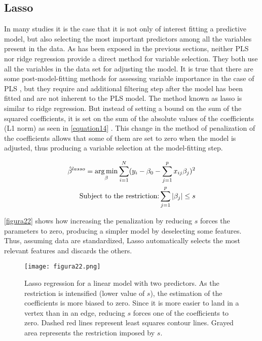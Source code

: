 \subsection{Lasso}
\label{lasso}
In many studies it is the case that it is not only of interest fitting a predictive model, but also selecting the most important predictors among all the variables present in the data. As has been exposed in the previous sections, neither PLS nor ridge regression provide a direct method for variable selection. They both use all the variables in the data set for adjusting the model. It is true that there are some post-model-fitting methods for assessing variable importance in the case of PLS \parencite{mehmood2012review}, but they require and additional filtering step after the model has been fitted and are not inherent to the PLS model. The method known as lasso is similar to ridge regression. But instead of setting a bound on the sum of the squared coefficients, it is set on the sum of the absolute values of the coefficients (L1 norm) as seen in \autoref{equation14} \parencite{tibshirani1996regression}. This change in the method of penalization of the coefficients allows that some of them are set to zero when the model is adjusted, thus producing a variable selection at the model-fitting step.

\begin{equation}
\label{equation14}
\begin{split}
\hat{\beta}^{lasso}=\operatorname*{arg\,min}_\beta \sum\limits_{i=1}^N (y_{i}-\beta_{0}-\sum\limits_{j=1}^p x_{ij}\beta_{j})^{2} \\
\textrm{Subject to the restriction:}  \sum\limits_{j=1}^p |\beta_{j}|\leq s
\end{split}
\end{equation}

\autoref{figura22} shows how increasing the penalization by reducing $s$ forces the parameters to zero, producing a simpler model by deselecting some features. Thus, assuming data are standardized, Lasso automatically selects the most relevant features and discards the others.

\begin{figure}[hbtp]
\centering
\texttt{[image: figura22.png]}
\caption{Lasso regression for a linear model with two predictors. As the restriction is intensified (lower value of $s$), the estimation of the coefficients is more biased to zero. Since it is more easier to land in a vertex than in an edge, reducing $s$ forces one of the coefficients to zero. Dashed red lines represent least squares contour lines. Grayed area represents the restriction imposed by $s$.}
\label{figura22}
\end{figure}

